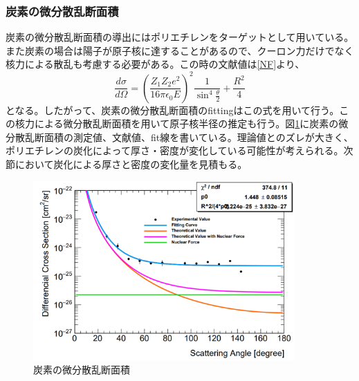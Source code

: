 \documentclass[a4paper,11pt,dvipdfmx]{jsarticle}
\begin{document}
\subsubsection{炭素の微分散乱断面積}\label{C1}
炭素の微分散乱断面積の導出にはポリエチレンをターゲットとして用いている。また炭素の場合は陽子が原子核に達することがあるので、クーロン力だけでなく核力による散乱も考慮する必要がある。この時の文献値は\ref{NF}より、
\begin{equation}
    \frac{d\sigma}{d\Omega} = \left(\frac{Z_1Z_2e^2}{16\pi\epsilon_0E}\right)^2\frac{1}{\sin^4{\frac{\theta}{2}}} + \frac{R^2}{4}
\end{equation}
となる。したがって、炭素の微分散乱断面積のfittingはこの式を用いて行う。この核力による微分散乱断面積を用いて原子核半径の推定も行う。図\ref{tanso1}に炭素の微分散乱断面積の測定値、文献値、fit線を書いている。理論値とのズレが大きく、ポリエチレンの炭化によって厚さ・密度が変化している可能性が考えられる。次節において炭化による厚さと密度の変化量を見積もる。
\begin{figure}[H]
\centering
\includegraphics[width=100mm]{picture/jan/C1.png}
\caption{炭素の微分散乱断面積}
\label{tanso1}
\end{figure}
\end{document}
